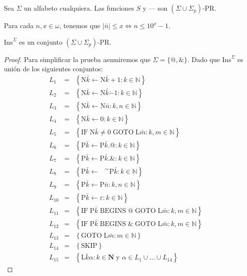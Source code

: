   \begin{lemma}
    \PN Sea $\Sigma$ un alfabeto cualquiera. Las funciones $S$ y \---- son $(\Sigma \cup \Sigma_{p})$-PR.
  \end{lemma}

  \begin{lemma}
    \PN Para cada $n, x \in \omega$, tenemos que $\lvert \bar{n} \rvert \leq x \Leftrightarrow n \leq 10^{x}-1$.
  \end{lemma}

  \begin{lemma}
    \PN $\mathrm{Ins}^{\Sigma}$ es un conjunto $(\Sigma \cup \Sigma_{p})$-PR.
  \end{lemma}
  \begin{proof}
    \PN Para simplificar la prueba asumiremos que $\Sigma =\{@,\&\}$. Dado que $\mathrm{Ins}^{\Sigma}$ es unión de los
    siguientes conjuntos:
    \begin{eqnarray*}
      L_{1} &=& \left\{\mathrm{N}\bar{k}\leftarrow \mathrm{N}\bar{k}+1:k\in \mathbb{N}\right\} \\
      L_{2} &=& \left\{\mathrm{N}\bar{k}\leftarrow \mathrm{N}\bar{k}\dot{-}1:k\in \mathbb{N}\right\} \\
      L_{3} &=& \left\{\mathrm{N}\bar{k}\leftarrow \mathrm{N}\bar{n}:k,n\in \mathbb{N}\right\} \\
      L_{4} &=& \left\{\mathrm{N}\bar{k}\leftarrow 0:k\in \mathbb{N}\right\} \\
      L_{5} &=& \left\{\mathrm{IF}\;\mathrm{N}\bar{k}\neq 0\;\mathrm{GOTO}\;
                       \mathrm{L}\bar{m}:k,m\in \mathbb{N}\right\} \\
      L_{6} &=& \left\{\mathrm{P}\bar{k}\leftarrow \mathrm{P}\bar{k}.@:k\in \mathbb{N}\right\} \\
      L_{7} &=& \left\{\mathrm{P}\bar{k}\leftarrow \mathrm{P}\bar{k}.\& :k\in \mathbb{N}\right\} \\
      L_{8} &=& \left\{\mathrm{P}\bar{k}\leftarrow \text{ }^{\curvearrowright }
                       \mathrm{P}\bar{k}:k\in \mathbb{N}\right\} \\
      L_{9} &=& \left\{\mathrm{P}\bar{k}\leftarrow \mathrm{P}\bar{n}:k,n\in \mathbb{N}\right\} \\
      L_{10} &=& \left\{\mathrm{P}\bar{k}\leftarrow \varepsilon :k\in \mathbb{N} \right\} \\
      L_{11} &=& \left\{\mathrm{IF}\;\mathrm{P}\bar{k}\;\mathrm{BEGINS}\;@\; \mathrm{GOTO}\;
                        \mathrm{L}\bar{m}:k,m\in \mathbb{N}\right\} \\
      L_{12} &=& \left\{\mathrm{IF}\;\mathrm{P}\bar{k}\;\mathrm{BEGINS}\;\& \; \mathrm{GOTO}\;
                        \mathrm{L}\bar{m}:k,m\in \mathbb{N}\right\} \\
      L_{13} &=& \left\{\mathrm{GOTO}\;\mathrm{L}\bar{m}:m\in \mathbb{N}\right\} \\
      L_{14} &=& \left\{\mathrm{SKIP}\right\} \\
      L_{15} &=& \left\{\mathrm{L}\bar{k}\alpha :k\in \mathbf{N\;}
                        \text{y }\alpha \in L_{1}\cup \dotsc\cup L_{14}\right\}
    \end{eqnarray*}


\end{proof}
